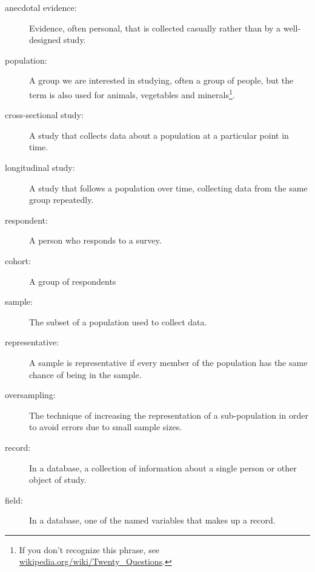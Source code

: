\documentclass[12pt]{book}
\begin{document}
\begin{description}

\item[anecdotal evidence:] Evidence, often personal, that is collected
  casually rather than by a well-designed study.


\item[population:] A group we are interested in studying, often a
  group of people, but the term is also used for animals, vegetables
  and minerals\footnote{If you don't recognize this phrase, see
    \url{wikipedia.org/wiki/Twenty_Questions}.}.


\item[cross-sectional study:] A study that collects data about a
population at a particular point in time.


\item[longitudinal study:] A study that follows a population over
time, collecting data from the same group repeatedly.


\item[respondent:] A person who responds to a survey.

\item[cohort:] A group of respondents

\item[sample:] The subset of a population used to collect data.

\item[representative:] A sample is representative if every member
of the population has the same chance of being in the sample.


\item[oversampling:] The technique of increasing the representation
of a sub-population in order to avoid errors due to small sample
sizes.


\item[record:] In a database, a collection of information about
a single person or other object of study.

\item[field:] In a database, one of the named variables that makes
up a record.


\end{description}
\end{document}
